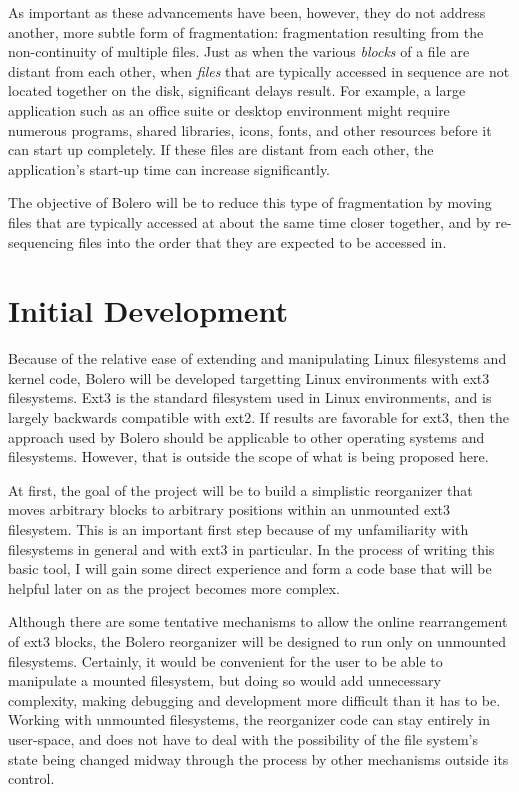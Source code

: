 \documentclass[10pt]{article}
\begin{document}
As important as these advancements have been, however, they do not address another, more subtle form of fragmentation: fragmentation resulting from the non-continuity of multiple files.
Just as when the various \emph{blocks} of a file are distant from each other, when \emph{files} that are typically accessed in sequence are not located together on the disk, significant delays result. For example, a large application such as an office suite or desktop environment might require numerous programs, shared libraries, icons, fonts, and other resources before it can start up completely. If these files are distant from each other,
the application's start-up time can increase significantly.

The objective of Bolero will be to reduce this type of fragmentation by moving files that
are typically accessed at about the same time closer together, and by re-sequencing files
into the order that they are expected to be accessed in.

\section{Initial Development}

Because of the relative ease of extending and manipulating Linux filesystems and
kernel code, Bolero will be developed targetting Linux environments with ext3
filesystems. Ext3 is the standard filesystem used in Linux
environments, and is largely backwards compatible with ext2\cite{ext2journal}.
If results are favorable for ext3, then the approach used by Bolero should be
applicable to other operating systems and filesystems. However, that is outside
the scope of what is being proposed here.

At first, the goal of the project will be to build a simplistic reorganizer
that moves arbitrary blocks to arbitrary positions within an unmounted ext3
filesystem. This is an important first step because of my unfamiliarity with
filesystems in general and with ext3 in particular. In the process of writing this basic
tool, I will gain some direct experience and form a code base that will be 
helpful later on as the project becomes more complex.

Although there are some tentative mechanisms to allow the online rearrangement
of ext3 blocks\cite{ext3online}, the Bolero reorganizer will be
designed to run only on unmounted filesystems. Certainly, it would be
convenient for the user to be able to manipulate a mounted filesystem, but doing so
would add unnecessary complexity, making debugging and
development more difficult than it has to be. Working with unmounted filesystems,
the reorganizer code can stay entirely in user-space, and does not have
to deal with the possibility of the file system's state being changed
midway through the process by other mechanisms outside its control.
\end{document}
